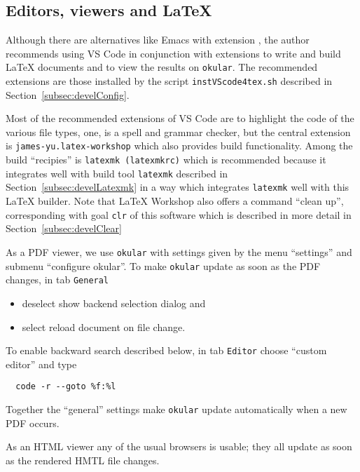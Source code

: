 \subsection{Editors, viewers and \LaTeX}\label{subsec:editViewLatex}

Although there are alternatives like Emacs with extension \auctex, 
the author recommends using VS Code in conjunction with extensions 
to write and build \LaTeX{} documents 
and to view the results on \texttt{okular}. 
The recommended extensions are those 
installed by the script \texttt{instVScode4tex.sh} 
described in Section~\ref{subsec:develConfig}. 

Most of the recommended extensions of VS Code 
are to highlight the code of the various file types, 
one, \ltex{} is a spell and grammar checker, 
but the central extension is \texttt{james-yu.latex-workshop} 
which also provides build functionality. 
Among the build ``recipies'' is \texttt{latexmk (latexmkrc)} 
which is recommended because it integrates well with build tool \texttt{latexmk} 
described in Section~\ref{subsec:develLatexmk} 
in a way which integrates \texttt{latexmk} well with this \LaTeX{} builder. 
Note that \LaTeX{} Workshop also offers a command ``clean up'', 
corresponding with goal \texttt{clr} of this software 
which is described in more detail in Section~\ref{subsec:develClear}

As a PDF viewer, we use \texttt{okular} 
with settings given by the menu ``settings'' 
and submenu ``configure okular''. 
To make \texttt{okular} update as soon as the PDF changes, 
in tab \texttt{General} 
\begin{itemize}
  \item deselect show backend selection dialog and 
  \item select reload document on file change. 
\end{itemize}

To enable backward search described below, 
in tab \texttt{Editor} choose ``custom editor'' and type 
%
\begin{Verbatim}
  code -r --goto %f:%l
\end{Verbatim}

Together the ``general'' settings make \texttt{okular} update automatically 
when a new PDF occurs. 

As an HTML viewer any of the usual browsers is usable; 
they all update as soon as the rendered HMTL file changes. 

